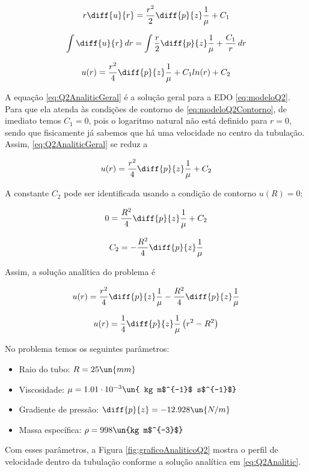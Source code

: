 \[ r \diff{u}{r} = \frac{r^2}{2} \diff{p}{z} \frac{1}{\mu} + C_1 \]

\[ \int \diff{u}{r} \, dr = \int  \frac{r}{2} \diff{p}{z} \frac{1}{\mu} + \frac{C_1}{r} \, dr \]

\begin{equation}\label{eq:Q2AnaliticGeral}
    u(r) = \frac{r^2}{4} \diff{p}{z} \frac{1}{\mu} + C_1 ln (r) + C_2
\end{equation}

A equação \eqref{eq:Q2AnaliticGeral} é a solução geral para a EDO \eqref{eq:modeloQ2}.
Para que ela atenda às condições de contorno de \eqref{eq:modeloQ2Contorno}, de imediato
temos $C_1 = 0$, pois o logaritmo natural não está definido para $r = 0$,
sendo que fisicamente já sabemos que há uma velocidade no centro da tubulação. Assim,
\eqref{eq:Q2AnaliticGeral} se reduz a

\[ u(r) = \frac{r^2}{4} \diff{p}{z} \frac{1}{\mu} + C_2 \]

A constante $C_2$ pode ser identificada usando a condição de contorno $u(R) = 0$:

\[ 0 = \frac{R^2}{4} \diff{p}{z} \frac{1}{\mu} + C_2 \]

\[ C_2 = - \frac{R^2}{4} \diff{p}{z} \frac{1}{\mu} \]

Assim, a solução analítica do problema é

\[ u(r) = \frac{r^2}{4} \diff{p}{z} \frac{1}{\mu} - \frac{R^2}{4} \diff{p}{z} \frac{1}{\mu}  \]

\begin{equation}\label{eq:Q2Analitic}
    u(r) = \frac{1}{4} \diff{p}{z} \frac{1}{\mu} \left(r^2 - R^2\right)
\end{equation}

No problema temos os seguintes parâmetros:

\begin{itemize}
    \item Raio do tubo: $R=25 \un{mm}$
    \item Viscosidade: $\mu=1.01 \cdot 10^{-3} \un{ kg m$^{-1}$ s$^{-1}$}$
    \item Gradiente de pressão: $\diff{p}{z}=-12.928 \un{N/m}$
    \item Massa específica: $\rho=998 \un{kg m$^{-3}$}$
\end{itemize}

Com esses parâmetros, a Figura \ref*{fig:graficoAnaliticoQ2} mostra o perfil
de velocidade dentro da tubulação conforme a solução analítica em
\eqref{eq:Q2Analitic}.

